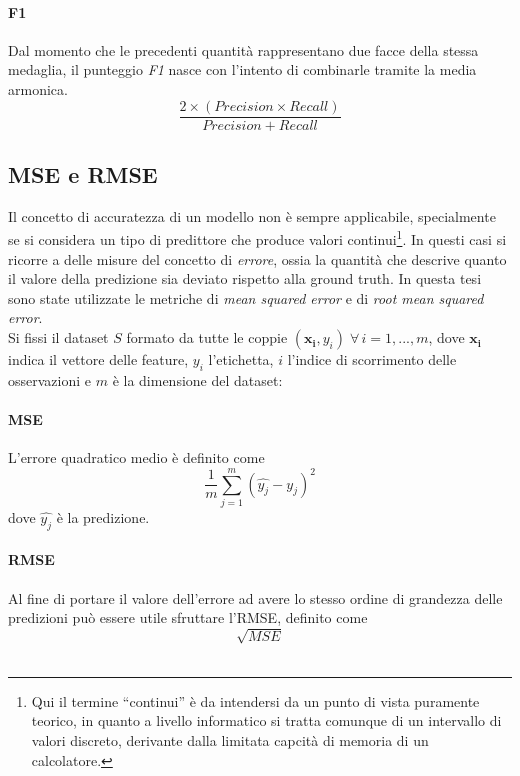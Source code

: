 \documentclass[12pt]{report}
\theoremstyle{definition}
\begin{document}
\paragraph{F1}
Dal momento che le precedenti quantità rappresentano due facce della stessa medaglia, il punteggio \textit{F1} nasce con l'intento di combinarle tramite la media armonica.
\begin{equation}
\frac{2 \times (Precision \times Recall)}{Precision + Recall}
\end{equation}

\subsection{MSE e RMSE}\label{erroreregr}
Il concetto di accuratezza di un modello non è sempre applicabile, specialmente se si considera un tipo di predittore che produce valori continui\footnote{Qui il termine ``continui'' è da intendersi da un punto di vista puramente teorico, in quanto a livello informatico si tratta comunque di un intervallo di valori discreto, derivante dalla limitata capcità di memoria di un calcolatore.}. In questi casi si ricorre a delle misure del concetto di \textit{errore}, ossia la quantità che descrive quanto il valore della predizione sia deviato rispetto alla ground truth.
In questa tesi sono state utilizzate le metriche di \textit{mean squared error} e di \textit{root mean squared error}.
\\
Si fissi il dataset $S$ formato da tutte le coppie $(\mathbf{x_i},y_i) \; \forall\,i=1, ..., m$, dove $\mathbf{x_i}$ indica il vettore delle feature, $y_i$ l'etichetta, $i$ l'indice di scorrimento delle osservazioni e $m$ è la dimensione del dataset:
\paragraph{MSE} L'errore quadratico medio è definito come
\begin{equation}
    \frac{1}{m}\sum\limits_{j=1}^m (\hat{y_j} - y_j)^2
\end{equation}
dove $\hat{y_j}$ è la predizione.
\paragraph{RMSE}
Al fine di portare il valore dell'errore ad avere lo stesso ordine di grandezza delle predizioni può essere utile sfruttare l'RMSE, definito come 
\begin{equation}
    \sqrt{MSE}
\end{equation}
\\
\end{document}
